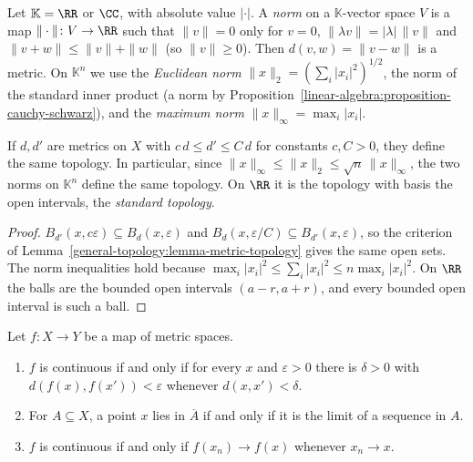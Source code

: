 \begin{definition}\label{general-topology:definition-normed-space}
Let $\mathbb{K} = \RR$ or $\CC$, with absolute value $|\cdot|$. A \emph{norm} on a $\mathbb{K}$-vector space $V$ is a map
$\| \cdot \| \colon V \to \RR$ such that $\|v\| = 0$ only for $v = 0$, $\|\lambda v\| = |\lambda|\,\|v\|$ and $\|v + w\| \leq \|v\| + \|w\|$
(so $\|v\| \geq 0$). Then $d(v, w) = \|v - w\|$ is a metric. On $\mathbb{K}^n$ we use the \emph{Euclidean norm}
$\|x\|_2 = (\sum_i |x_i|^2)^{1/2}$, the norm of the standard inner product (a norm by
Proposition~\ref{linear-algebra:proposition-cauchy-schwarz}), and the \emph{maximum norm} $\|x\|_\infty = \max_i |x_i|$.
\end{definition}

\begin{lemma}\label{general-topology:lemma-equivalent-metrics}
If $d, d'$ are metrics on $X$ with $c\,d \leq d' \leq C\,d$ for constants $c, C > 0$, they define the same topology. In particular, since
$\|x\|_\infty \leq \|x\|_2 \leq \sqrt{n}\,\|x\|_\infty$, the two norms on $\mathbb{K}^n$ define the same topology. On $\RR$ it is the topology with
basis the open intervals, the \emph{standard topology}.
\end{lemma}

\begin{proof}
$B_{d'}(x, c\varepsilon) \subseteq B_d(x, \varepsilon)$ and $B_d(x, \varepsilon/C) \subseteq B_{d'}(x, \varepsilon)$, so the criterion of
Lemma~\ref{general-topology:lemma-metric-topology} gives the same open sets. The norm inequalities hold because
$\max_i |x_i|^2 \leq \sum_i |x_i|^2 \leq n \max_i |x_i|^2$. On $\RR$ the balls are the bounded open intervals $(a - r, a + r)$, and every bounded
open interval is such a ball.
\end{proof}

\begin{proposition}\label{general-topology:proposition-metric-continuity}
Let $f \colon X \to Y$ be a map of metric spaces.
\begin{enumerate}
\item $f$ is continuous if and only if for every $x$ and $\varepsilon > 0$ there is $\delta > 0$ with $d(f(x), f(x')) < \varepsilon$ whenever
$d(x, x') < \delta$.
\item For $A \subseteq X$, a point $x$ lies in $\overline{A}$ if and only if it is the limit of a sequence in $A$.
\item $f$ is continuous if and only if $f(x_n) \to f(x)$ whenever $x_n \to x$.
\end{enumerate}
\end{proposition}

